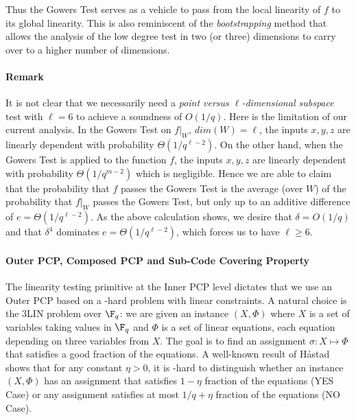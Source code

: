 Thus the Gowers Test serves as a vehicle to pass
from the local linearity of $f$ to its global linearity. This is also reminiscent of the
\emph{bootstrapping} method that allows the analysis of the low degree test in two (or three)
dimensions to carry over to a higher number of dimensions.

\paragraph{Remark} It is not clear that we necessarily need a \emph{point
versus $\ell$-dimensional subspace} test with $\ell=6$
to achieve a soundness of $O({1}/{q})$. Here is the
limitation of our current analysis.  In the Gowers Test
on $f|_W$, $dim(W)=\ell$, the
inputs $x, y, z$ are linearly dependent with probability
$\Theta({1}/{q^{\ell-2}})$. On the other hand, when the Gowers Test is
applied to the function $f$, the inputs $x,y,z$ are linearly dependent with probability
$\Theta({1}/{q^{m-2}} )$ which is negligible.  Hence we are able to claim that
the probability that $f$ passes the Gowers Test is the average (over $W$)  of the probability that $f|_W$ passes the Gowers Test, but only up to an additive difference of $e = \Theta({1}/{q^{\ell-2}})$. As the above calculation shows, we desire that $\delta
=O({1}/{q})$ and that $\delta^4$ dominates
$e = \Theta({1}/{q^{\ell-2}})$, which forces us to have $\ell \geq 6$.



\paragraph{Outer PCP, Composed PCP and Sub-Code Covering Property}
The linearity testing primitive at the Inner PCP level dictates that we use an Outer PCP
based on a -hard problem with linear constraints. A natural choice is the 3LIN problem
over $\F_q$: we are given an instance $(X, \Phi)$ where $X$ is a set of variables taking
values in $\F_q$ and $\Phi$ is a set of linear equations, each equation depending on three
variables from $X$. The goal is to find an assignment $\sigma: X \mapsto \Phi$ that
satisfies a good fraction of the equations. A well-known result of H\aa stad~\cite{Has97}
shows that for any constant $\eta > 0$,
it is -hard to distinguish whether an instance $(X,\Phi)$ has an assignment
that satisfies $1-\eta$ fraction of the equations (YES Case) or any assignment satisfies at most
${1}/{q}+\eta$ fraction of the equations (NO Case).

